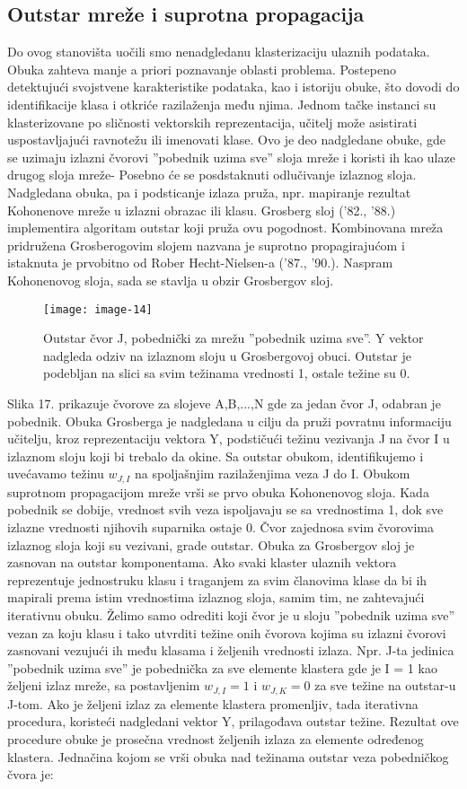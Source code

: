 \documentclass[fontsize=11bp, paper=a4]{scrarticle}
\begin{document}
\subsection{Outstar mreže i suprotna propagacija}
Do ovog stanovišta uočili smo nenadgledanu klasterizaciju ulaznih podataka. Obuka zahteva manje a priori poznavanje oblasti problema. Postepeno detektujući svojstvene karakteristike podataka, kao i istoriju obuke, što dovodi do identifikacije klasa i otkriće razilaženja među njima. Jednom tačke instanci su klasterizovane po sličnosti vektorskih reprezentacija, učitelj može asistirati uspostavljajući ravnotežu ili imenovati klase. Ovo je deo nadgledane obuke, gde se uzimaju izlazni čvorovi ''pobednik uzima sve'' sloja mreže i koristi ih kao ulaze drugog sloja mreže- Posebno će se posdstaknuti odlučivanje izlaznog sloja. Nadgledana obuka, pa i podsticanje izlaza pruža, npr. mapiranje rezultat Kohonenove mreže u izlazni obrazac ili klasu. Grosberg sloj ('82., '88.) implementira algoritam outstar koji pruža ovu pogodnost. Kombinovana mreža pridružena Grosberogovim slojem nazvana je suprotno propagirajućom i istaknuta je prvobitno od Rober Hecht-Nielsen-a ('87., '90.). Naspram Kohonenovog sloja, sada se stavlja u obzir Grosbergov sloj.
\begin{figure}[h!]
    \centering
    \texttt{[image: image-14]}
    \caption{Outstar čvor J, pobednički za mrežu ''pobednik uzima sve''. Y vektor nadgleda odziv na izlaznom sloju u Grosbergovoj obuci. Outstar je podebljan na slici sa svim težinama vrednosti 1, ostale težine su 0.}
\end{figure}
Slika 17. prikazuje čvorove za slojeve A,B,...,N gde za jedan čvor J, odabran je pobednik. Obuka Grosberga je nadgledana u cilju da pruži povratnu informaciju učitelju, kroz reprezentaciju vektora Y, podstičući težinu vezivanja J na čvor I u izlaznom sloju koji bi trebalo da okine. Sa outstar obukom, identifikujemo i uvećavamo težinu $w_{J, I}$ na spoljašnjim razilaženjima veza J do I. Obukom suprotnom propagacijom mreže vrši se prvo obuka Kohonenovog sloja. Kada pobednik se dobije, vrednost svih veza ispoljavaju se sa vrednostima 1, dok sve izlazne vrednosti njihovih suparnika ostaje 0. Čvor zajednosa svim čvorovima izlaznog sloja koji su vezivani, grade outstar. Obuka za Grosbergov sloj je zasnovan na outstar komponentama. Ako svaki klaster ulaznih vektora reprezentuje jednostruku klasu i traganjem za svim članovima klase da bi ih mapirali prema istim vrednostima izlaznog sloja, samim tim, ne zahtevajući iterativnu obuku. Želimo samo odrediti koji čvor je u sloju ''pobednik uzima sve'' vezan za koju klasu i tako utvrditi težine onih čvorova kojima su izlazni čvorovi zasnovani vezujući ih među klasama i željenih vrednosti izlaza. Npr. J-ta jedinica ''pobednik uzima sve'' je pobednička za sve elemente klastera gde je I = 1 kao željeni izlaz mreže, sa postavljenim $w_{J, I} = 1$ i $w_{J, K} = 0$ za sve težine na outstar-u J-tom. Ako je željeni izlaz za elemente klastera promenljiv, tada iterativna procedura, koristeći nadgledani vektor Y, prilagođava outstar težine. Rezultat ove procedure obuke je prosečna vrednost željenih izlaza za elemente određenog klastera. Jednačina kojom se vrši obuka nad težinama outstar veza pobedničkog čvora je:
\end{document}
